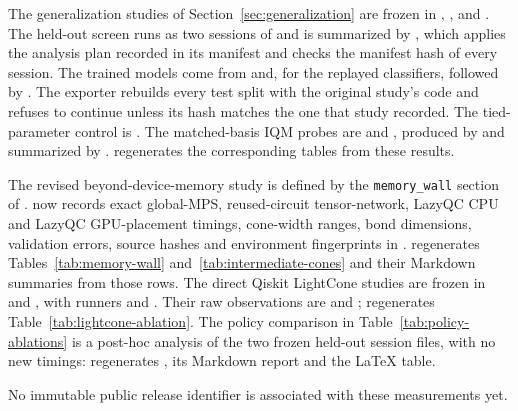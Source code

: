 The generalization studies of Section~\ref{sec:generalization} are frozen in , ,  and . The held-out screen runs as two sessions of  and is summarized by , which applies the analysis plan recorded in its manifest and checks the manifest hash of every session. The trained models come from  and, for the replayed classifiers,  followed by . The exporter rebuilds every test split with the original study's code and refuses to continue unless its hash matches the one that study recorded. The tied-parameter control is . The matched-basis IQM probes are  and , produced by  and summarized by .  regenerates the corresponding tables from these results.

The revised beyond-device-memory study is defined by the \texttt{memory\_wall} section of .  now records exact global-MPS, reused-circuit tensor-network, LazyQC CPU and LazyQC GPU-placement timings, cone-width ranges, bond dimensions, validation errors, source hashes and environment fingerprints in .  regenerates Tables~\ref{tab:memory-wall} and~\ref{tab:intermediate-cones} and their Markdown summaries from those rows. The direct Qiskit LightCone studies are frozen in  and , with runners  and . Their raw observations are  and ;  regenerates Table~\ref{tab:lightcone-ablation}. The policy comparison in Table~\ref{tab:policy-ablations} is a post-hoc analysis of the two frozen held-out session files, with no new timings:  regenerates , its Markdown report and the LaTeX table.

No immutable public release identifier is associated with these measurements yet.
